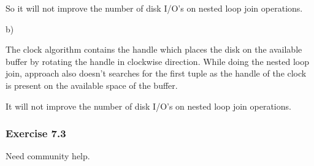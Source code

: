 \documentclass[../../main.tex]{subfiles}
\begin{document}
So it will not improve the number of disk I/O's on nested loop
join operations.

b)

The clock algorithm contains the handle which places the disk on the
available buffer by rotating the handle in clockwise direction. While doing
the nested loop join, approach also doesn't searches for the first tuple as
the handle of the clock is present on the available space of the buffer.

It will not improve the number of disk I/O's on nested loop join
operations.

\subsubsection*{Exercise 7.3}

Need community help.
\end{document}
